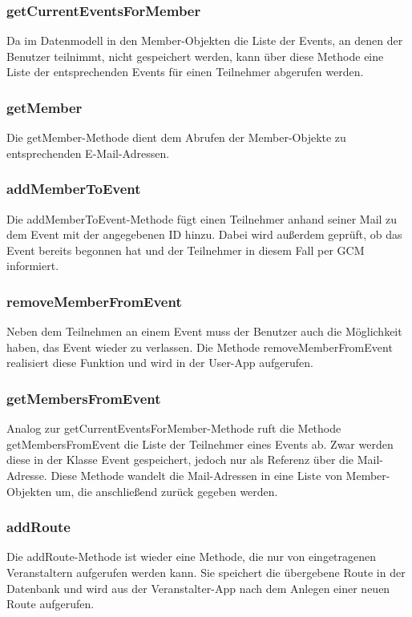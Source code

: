 \subsubsection*{getCurrentEventsForMember}
Da im Datenmodell in den Member-Objekten die Liste der Events, an denen der Benutzer teilnimmt, nicht gespeichert werden, kann über diese Methode eine Liste der entsprechenden Events für einen Teilnehmer abgerufen werden.

\subsubsection*{getMember}
Die getMember-Methode dient dem Abrufen der Member-Objekte zu entsprechenden E-Mail-Adressen.

\subsubsection*{addMemberToEvent}
Die addMemberToEvent-Methode fügt einen Teilnehmer anhand seiner Mail zu dem Event mit der angegebenen ID hinzu. Dabei wird außerdem geprüft, ob das Event bereits begonnen hat und der Teilnehmer in diesem Fall per GCM informiert.

\subsubsection*{removeMemberFromEvent}
Neben dem Teilnehmen an einem Event muss der Benutzer auch die Möglichkeit haben, das Event wieder zu verlassen. Die Methode removeMemberFromEvent realisiert diese Funktion und wird in der User-App aufgerufen.

\subsubsection*{getMembersFromEvent}
Analog zur getCurrentEventsForMember-Methode ruft die Methode getMembersFromEvent die Liste der Teilnehmer eines Events ab. Zwar werden diese in der Klasse Event gespeichert, jedoch nur als Referenz über die Mail-Adresse. Diese Methode wandelt die Mail-Adressen in eine Liste von Member-Objekten um, die anschließend zurück gegeben werden.

\subsubsection*{addRoute}
Die addRoute-Methode ist wieder eine Methode, die nur von eingetragenen Veranstaltern aufgerufen werden kann. Sie speichert die übergebene Route in der Datenbank und wird aus der Veranstalter-App nach dem Anlegen einer neuen Route aufgerufen.

